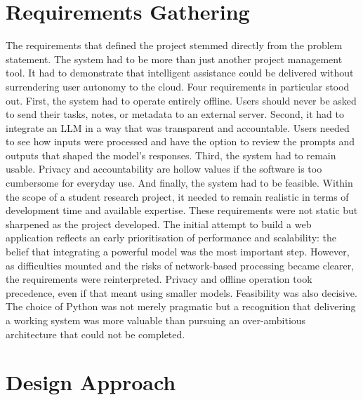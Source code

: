 \documentclass{report}
\begin{document}
\section{Requirements Gathering}

The requirements that defined the project stemmed directly from the problem statement. The system had to be more than just another project management tool. It had to demonstrate that intelligent assistance could be delivered without surrendering user autonomy to the cloud. Four requirements in particular stood out.
First, the system had to operate entirely offline. Users should never be asked to send their tasks, notes, or metadata to an external server. Second, it had to integrate an LLM in a way that was transparent and accountable. Users needed to see how inputs were processed and have the option to review the prompts and outputs that shaped the model’s responses. Third, the system had to remain usable. Privacy and accountability are hollow values if the software is too cumbersome for everyday use. And finally, the system had to be feasible. Within the scope of a student research project, it needed to remain realistic in terms of development time and available expertise.
These requirements were not static but sharpened as the project developed. The initial attempt to build a web application reflects an early prioritisation of performance and scalability: the belief that integrating a powerful model was the most important step. However, as difficulties mounted and the risks of network-based processing became clearer, the requirements were reinterpreted. Privacy and offline operation took precedence, even if that meant using smaller models. Feasibility was also decisive. The choice of Python was not merely pragmatic but a recognition that delivering a working system was more valuable than pursuing an over-ambitious architecture that could not be completed.

\section{Design Approach}
\end{document}
